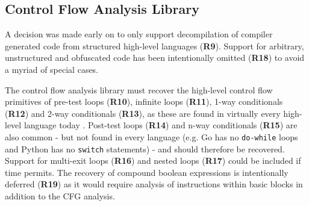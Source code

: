 
\subsection{Control Flow Analysis Library}
\label{sec:req_control_flow_analysis_library}

A decision was made early on to only support decompilation of compiler generated code from structured high-level languages (\textbf{R9}). Support for arbitrary, unstructured and obfuscated code has been intentionally omitted (\textbf{R18}) to avoid a myriad of special cases.

The control flow analysis library must recover the high-level control flow primitives of pre-test loops (\textbf{R10}), infinite loops (\textbf{R11}), 1-way conditionals (\textbf{R12}) and 2-way conditionals (\textbf{R13}), as these are found in virtually every high-level language today \cite{reverse_comp}. Post-test loops (\textbf{R14}) and n-way conditionals (\textbf{R15}) are also common - but not found in every language (e.g. Go has no \texttt{do-while} loops and Python has no \texttt{switch} statements) - and should therefore be recovered. Support for multi-exit loops (\textbf{R16}) and nested loops (\textbf{R17}) could be included if time permits. The recovery of compound boolean expressions is intentionally deferred (\textbf{R19}) as it would require analysis of instructions within basic blocks in addition to the CFG analysis.

